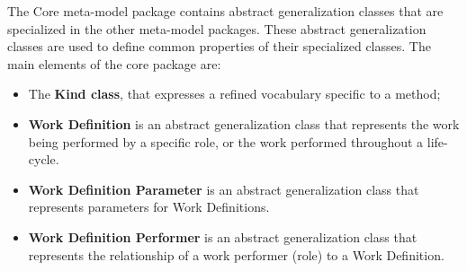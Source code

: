 The Core meta-model package contains abstract generalization classes that are specialized in the other meta-model packages. These abstract generalization classes are used to define
common properties of their specialized classes. The main elements of the core package are:
\begin{itemize}
\item The \textbf{Kind class}, that expresses a refined vocabulary specific to a method;
\item \textbf{Work Definition} is an abstract generalization class that represents the work being performed by a specific role, or the work performed throughout a life-cycle.
\item \textbf{Work Definition Parameter} is an abstract generalization class that represents parameters for Work Definitions.
\item \textbf{Work Definition Performer} is an abstract generalization class that represents the relationship of a work performer (role) to a Work Definition.
\end{itemize}